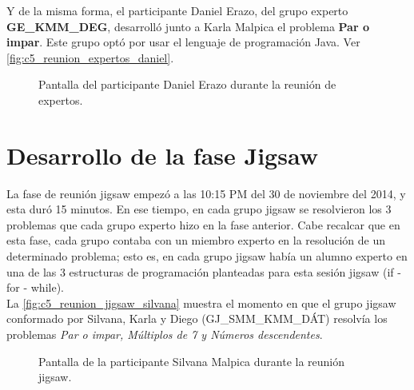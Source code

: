 Y de la misma forma, el participante Daniel Erazo, del grupo experto \textbf{GE\_KMM\_DEG},  desarrolló junto a Karla Malpica el problema \textbf{Par o impar}. Este grupo optó por usar el lenguaje de programación Java. Ver \autoref{fig:c5_reunion_expertos_daniel}.

\begin{figure}
	\centering
	\caption[Reunión de Expertos - Daniel Erazo]{Pantalla del participante Daniel Erazo durante la reunión de expertos.}
	\label{fig:c5_reunion_expertos_daniel}
\end{figure}

\section{Desarrollo de la fase Jigsaw}
La fase de reunión jigsaw empezó a las 10:15 PM del 30 de noviembre del 2014, y esta duró 15 minutos. En ese tiempo, en cada grupo jigsaw se resolvieron los 3 problemas que cada grupo experto hizo en la fase anterior. Cabe recalcar que en esta fase, cada grupo contaba con un miembro experto en la resolución de un determinado problema; esto es, en cada grupo jigsaw había un alumno experto en una de las 3 estructuras de programación planteadas para esta sesión jigsaw (if - for - while).\\

La \autoref{fig:c5_reunion_jigsaw_silvana} muestra el momento en que el grupo jigsaw conformado por Silvana, Karla y Diego (GJ\_SMM\_KMM\_DÁT) resolvía los problemas \emph{Par o impar, Múltiplos de 7 y Números descendentes}.

\begin{figure}
	\centering
	\caption[Reunión Jigsaw - Silvana Malpica]{Pantalla de la participante Silvana Malpica durante la reunión jigsaw.}
	\label{fig:c5_reunion_jigsaw_silvana}
\end{figure}
